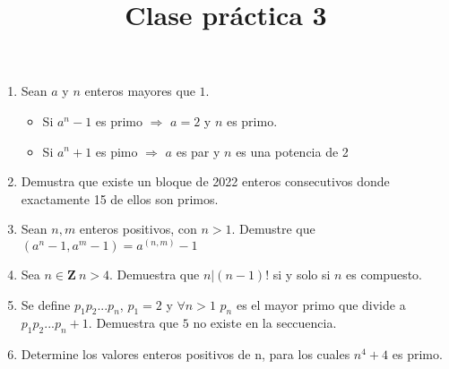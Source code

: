 \documentclass{article}
\begin{document}
\title{Clase pr\'actica 3}
\maketitle

\begin{enumerate}
    \item Sean $a$ y $n$ enteros mayores que $1$.
    \begin{itemize}
        \item Si $a^n - 1$ es primo $\Rightarrow$ $a=2$ y $n$ es primo.
        \item Si $a^n + 1$ es pimo $\Rightarrow$ $a$ es par y $n$ es una potencia de 2
    \end{itemize}
    \item Demustra que existe un bloque de 2022 enteros consecutivos donde exactamente 15 de ellos son primos.
    \item Sean $n,m$ enteros positivos, con $n>1$. Demustre que $(a^n -1, a^m -1)= a^{(n,m)} -1$
    \item Sea $n \in \mathbf{Z} ~ n>4$. Demuestra que $n|(n-1)!$ si y solo si $n$ es compuesto.
    \item Se define $p_1p_2...p_n$, $p_1 =2$ y $\forall n>1$ $p_n$ es el mayor primo que divide a $p_1p_2...p_n +1$. Demuestra que $5$ no existe en la seccuencia.
    \item Determine los valores enteros positivos de n, para los cuales $n^4 + 4$ es primo. 
\end{enumerate}
\end{document}
